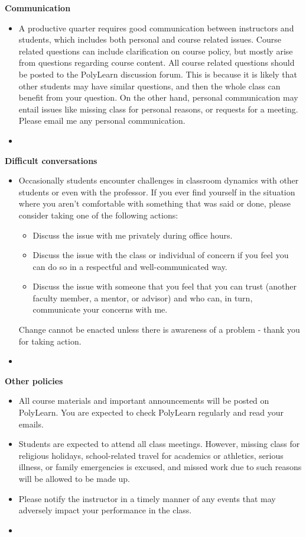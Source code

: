 \documentclass[letterpaper,12pt]{report}
\begin{document}
\textbf{Communication}
\begin{itemize}
\item[]
A productive quarter requires good communication between instructors and students, which includes both personal and course related issues. Course related questions can include clarification on course policy, but mostly arise from questions regarding course content. All course related questions should be posted to the PolyLearn discussion forum. This is because it is likely that other students may have similar questions, and then the whole class can benefit from your question. On the other hand, personal communication may entail issues like missing class for personal reasons, or requests for a meeting. Please email me any personal communication.
\item[]
\end{itemize}

\textbf{Difficult conversations}
\begin{itemize}
\item[]
Occasionally students encounter challenges in classroom dynamics with other students or even with the professor.  If you ever find yourself in the situation where you aren't comfortable with something that was said or done, please consider taking one of the following actions:
\begin{itemize}
\item Discuss the issue with me privately during office hours.
\item Discuss the issue with the class or individual of concern if you feel you can do so in a respectful and well-communicated way.
\item Discuss the issue with someone that you feel that you can trust (another faculty member, a mentor, or advisor) and who can, in turn, communicate your concerns with me.
\end{itemize}
Change cannot be enacted unless there is awareness of a problem - thank you for taking action.
\item[]
\end{itemize}

\textbf{Other policies}
\begin{itemize}
\item All course materials and important announcements will be posted on PolyLearn. You are expected to check PolyLearn regularly and read your emails.
\item Students are expected to attend all class meetings.  However, missing class for religious holidays, school-related travel for academics or athletics, serious illness, or family emergencies is excused, and missed work due to such reasons will be allowed to be made up.
\item Please notify the instructor in a timely manner of any events that may adversely impact your performance in the class.
\item[]
\end{itemize}
\end{document}
